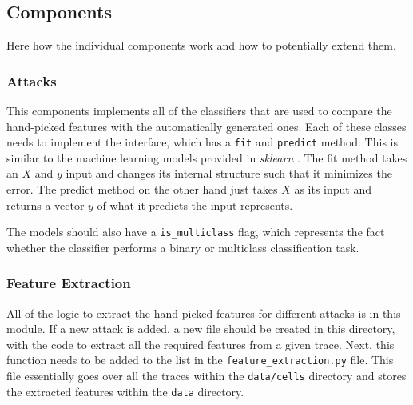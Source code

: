 
\subsection{Components}

Here how the individual components work and how to potentially extend them.

\subsubsection{Attacks}

This components implements all of the classifiers that are used to compare the hand-picked features with the automatically generated ones.
Each of these classes needs to implement the interface, which has a \texttt{fit} and \texttt{predict} method.
This is similar to the machine learning models provided in \textit{sklearn} \cite{scikitlearn}.
The fit method takes an $X$ and $y$ input and changes its internal structure such that it minimizes the error.
The predict method on the other hand just takes $X$ as its input and returns a vector $y$ of what it predicts the input represents.

The models should also have a \texttt{is\_multiclass} flag, which represents the fact whether the classifier performs a binary or multiclass classification task.

\subsubsection{Feature Extraction}

All of the logic to extract the hand-picked features for different attacks is in this module.
If a new attack is added, a new file should be created in this directory, with the code to extract all the required features from a given trace.
Next, this function needs to be added to the list in the \texttt{feature\_extraction.py} file.
This file essentially goes over all the traces within the \texttt{data/cells} directory and stores the extracted features within the \texttt{data} directory.

